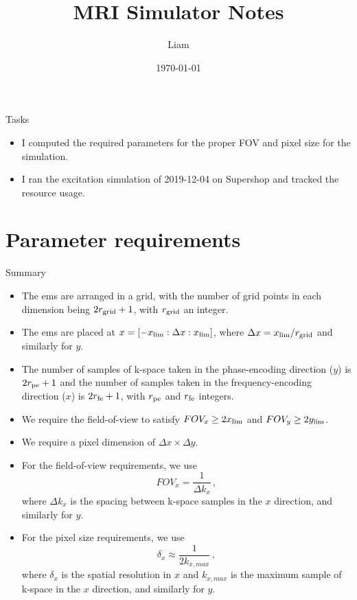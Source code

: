 \documentclass[dvipsnames]{beamer}
\title{MRI Simulator Notes}
\author{Liam}
\date{\today}
\begin{document}
\begin{frame}
\maketitle
\end{frame}

\begin{frame}{Tasks}
\begin{itemize}
\item I computed the required parameters for the proper FOV and pixel size for the simulation.
\item I ran the excitation simulation of 2019-12-04 on Supershop and tracked the resource usage.
\end{itemize}
\end{frame}

\section{Parameter requirements}

\begin{frame}{Summary}
\begin{itemize}
\item The ems are arranged in a grid, with the number of grid points in each dimension being $2r_{\rm grid}+1$, with $r_{\rm grid}$ an integer.
\item The ems are placed at $x = [-x_{\rm lim}: \Delta x: x_{\rm lim}]$, where $\Delta x = x_{\rm lim}/r_{\rm grid}$ and similarly for $y$.
\item The number of samples of k-space taken in the phase-encoding direction ($y$) is $2r_{\rm pe}+1$ and the number of samples taken in the frequency-encoding direction ($x$) is $2r_{\rm fe}+1$, with $r_{\rm pe}$ and $r_{\rm fe}$ integers.
\item We require the field-of-view to satisfy $FOV_x \geq 2x_{\rm lim}$ and $FOV_y \geq 2y_{\rm lim}$.
\item We require a pixel dimension of $\Delta x \times \Delta y$.
\end{itemize}
\end{frame}

\begin{frame}
\begin{itemize}
\item For the field-of-view requirements, we use
\begin{equation*}
FOV_x = \frac{1}{\Delta k_x}\,,
\end{equation*}
where $\Delta k_x$ is the spacing between k-space samples in the $x$ direction, and similarly for $y$.
\item For the pixel size requirements, we use
\begin{equation*}
\delta_x \approx \frac{1}{2k_{x,max}}\,,
\end{equation*}
where $\delta_x$ is the spatial resolution in $x$ and $k_{x,max}$ is the maximum sample of k-space in the $x$ direction, and similarly for $y$.
\end{itemize}
\end{frame}
\end{document}
